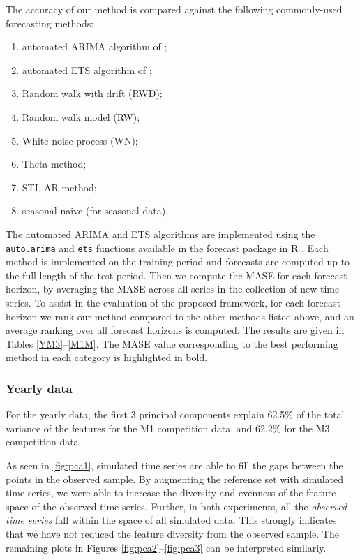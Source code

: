 \documentclass[11pt,a4paper,]{article}
\providecommand{\tightlist}{%
  \setlength{\itemsep}{0pt}\setlength{\parskip}{0pt}}
\theoremstyle{definition}
\theoremstyle{definition}
\theoremstyle{definition}
\theoremstyle{remark}
\begin{document}
The accuracy of our method is compared against the following
commonly-used forecasting methods:

\begin{enumerate}
\def\labelenumi{\arabic{enumi}.}
\tightlist
\item
  automated ARIMA algorithm of \textcite{Hyndman2008};
\item
  automated ETS algorithm of \textcite{Hyndman2008};
\item
  Random walk with drift (RWD);
\item
  Random walk model (RW);
\item
  White noise process (WN);
\item
  Theta method;
\item
  STL-AR method;
\item
  seasonal naive (for seasonal data).
\end{enumerate}

The automated ARIMA and ETS algorithms are implemented using the
\texttt{auto.arima} and \texttt{ets} functions available in the forecast
package in R \autocite{Hyndman2008}. Each method is implemented on the
training period and forecasts are computed up to the full length of the
test period. Then we compute the MASE for each forecast horizon, by
averaging the MASE across all series in the collection of new time
series. To assist in the evaluation of the proposed framework, for each
forecast horizon we rank our method compared to the other methods listed
above, and an average ranking over all forecast horizons is computed.
The results are given in Tables \ref{YM3}--\ref{M1M}. The MASE value
corresponding to the best performing method in each category is
highlighted in bold.

\subsubsection*{Yearly data}\label{yearly-data}

For the yearly data, the first 3 principal components explain 62.5\% of
the total variance of the features for the M1 competition data, and
62.2\% for the M3 competition data.

As seen in \autoref{fig:pca1}, simulated time series are able to fill
the gaps between the points in the observed sample. By augmenting the
reference set with simulated time series, we were able to increase the
diversity and evenness of the feature space of the observed time series.
Further, in both experiments, all the \emph{observed time series} fall
within the space of all simulated data. This strongly indicates that we
have not reduced the feature diversity from the observed sample. The
remaining plots in Figures \ref{fig:pca2}--\ref{fig:pca3} can be
interpreted similarly.
\end{document}
